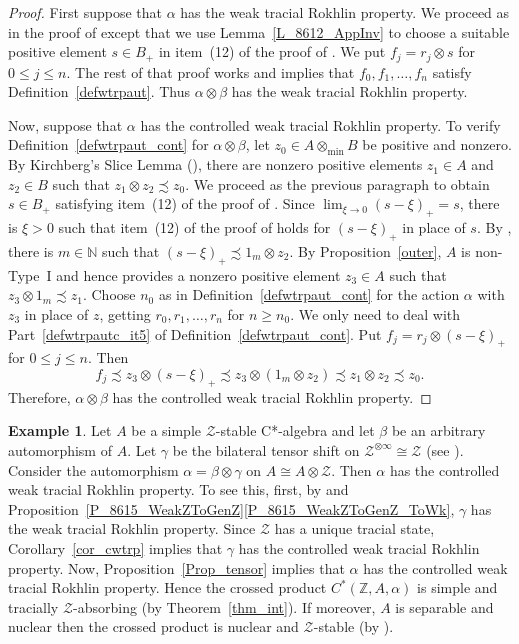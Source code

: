 \documentclass[11pt]{amsart}
\theoremstyle{plain}
\theoremstyle{definition}
\newtheorem{example}[theorem]{Example}
\theoremstyle{remark}
\numberwithin{equation}{section}
\begin{document}
\begin{proof}
First suppose that 
$\alpha$  has the weak tracial Rokhlin property. We proceed
as in the proof of \cite[Theorem~4.5]{FG17} except that
we use Lemma~\ref{L_8612_AppInv}
to choose a suitable positive element $s\in B_+$ in item~(12) of the
proof of  \cite[Theorem~4.5]{FG17}.
We put $f_j=r_j \otimes s$ for $0\leq j\leq n$. The rest of that
proof works and  implies that 
$f_0,f_1,\ldots,f_n$ satisfy Definition~\ref{defwtrpaut}.
Thus
$\alpha\otimes \beta$ 
has the weak tracial Rokhlin property.

Now, suppose that $\alpha$  has the
controlled weak tracial Rokhlin property.
To verify Definition~\ref{defwtrpaut_cont} for
 $\alpha\otimes \beta$,
let $z_0\in A\otimes_{\min} B$ be positive and nonzero.
By Kirchberg's Slice Lemma (\cite[Lemma~4.1.9]{Ro02}),
there are nonzero positive elements
$z_1\in A$ and $z_2\in B$ such that 
$z_1 \otimes z_2 \precsim z_0$.
We proceed
as  the previous paragraph to obtain $s\in B_+$
satisfying item~(12) of the
proof of  \cite[Theorem~4.5]{FG17}.
Since $\lim_{\xi\to 0} (s-\xi)_+=s$, there is $\xi>0$ such that
 item~(12) of the
proof of  \cite[Theorem~4.5]{FG17} holds  for $(s-\xi)_+$
in place of $s$. By \cite[Proposition~1.14]{Ph14}, there is 
$m\in\mathbb{N}$ such that $(s-\xi)_+ \precsim 1_m \otimes z_2$.
By Proposition~\ref{outer}, $A$ is non-Type~I and
hence \cite[Lemma~2.4]{Ph14} provides a nonzero
positive element $z_3\in A$ such that $z_3 \otimes 1_m \precsim z_1$.
Choose $n_0$ as in Definition~\ref{defwtrpaut_cont} for the action
$\alpha$ with $z_3$ in place of $z$, getting $r_0,r_1,\ldots,r_n$  
for $n\geq n_0$.
We only need to
deal with Part~\eqref{defwtrpautc_it5} of Definition~\ref{defwtrpaut_cont}.
Put $f_j=r_j \otimes (s-\xi)_+$ for $0\leq j\leq n$.
Then 
\[
f_j \precsim z_3 \otimes (s-\xi)_+ \precsim z_3 \otimes
(1_m \otimes z_2)\precsim z_1 \otimes z_2 \precsim z_0.
\]
Therefore, $\alpha\otimes \beta$ 
has the controlled weak tracial Rokhlin property.
\end{proof}

\begin{example}\label{Ex_auto}
 Let $A$ be a simple $\mathcal{Z}$-stable C*-algebra and
 let $\beta$ be an
arbitrary automorphism of $A$. 
Let $\gamma$ be the bilateral tensor shift on
$\mathcal{Z}^{\otimes \infty}\cong \mathcal{Z}$ 
(see \cite{Sato10}).
 Consider the automorphism $\alpha= \beta\otimes \gamma$ on $A\cong A\otimes \mathcal{Z}$.
 Then $\alpha$ has the controlled weak tracial Rokhlin property.
  To see this, first,  by \cite[Example~6.9]{HO13} and 
 Proposition~\ref{P_8615_WeakZToGenZ}\ref{P_8615_WeakZToGenZ_ToWk}, 
 $\gamma$ has  the  weak tracial Rokhlin property.
 Since $\mathcal{Z}$ has a unique tracial state,
 Corollary~\ref{cor_cwtrp} implies that 
 $\gamma$ has  the controlled weak tracial Rokhlin property.
 Now, Proposition~\ref{Prop_tensor} implies that
 $\alpha$  has  the controlled weak tracial Rokhlin property.
 Hence the crossed product $C^{*} ({\mathbb{Z}}, A, \alpha)$
 is simple and tracially $\mathcal{Z}$-absorbing
 (by Theorem~\ref{thm_int}).
 If moreover, $A$ is separable and nuclear then  the crossed product
 is nuclear and $\mathcal{Z}$-stable
 (by \cite[Theorem~A]{CLS2021}).
\end{example}
\end{document}
